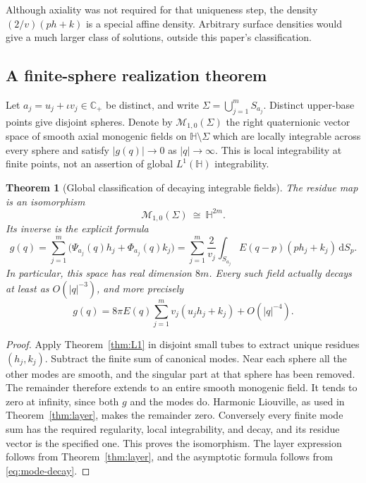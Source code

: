 \documentclass[11pt,a4paper]{article}
\numberwithin{equation}{section}
\newtheorem{theorem}{Theorem}[section]
\theoremstyle{definition}
\theoremstyle{remark}
\newcommand{\C}{\mathbb C}
\newcommand{\HH}{\mathbb H}
\newcommand{\dd}{\,\mathrm d}
\begin{document}
Although axiality was not required for that uniqueness step, the density
$(2/v)(ph+k)$ is a special affine density. Arbitrary surface densities
would give a much larger class of solutions, outside this paper's
classification.

\subsection{A finite-sphere realization theorem}
Let $a_j=u_j+\iota v_j\in\C_+$ be distinct, and write
$\Sigma=\bigcup_{j=1}^m S_{a_j}$. Distinct upper-base points give disjoint
spheres. Denote by $\mathcal M_{1,0}(\Sigma)$ the right quaternionic
vector space of smooth axial monogenic fields on $\HH\setminus\Sigma$
which are locally integrable across every sphere and satisfy
$|g(q)|\to0$ as $|q|\to\infty$. This is local integrability at finite
points, not an assertion of global $L^1(\HH)$ integrability.

\begin{theorem}[Global classification of decaying integrable fields]
\label{thm:global-class}
The residue map is an isomorphism
\begin{equation}\label{eq:global-iso}
 \mathcal M_{1,0}(\Sigma)\ \cong\ \HH^{2m}.
\end{equation}
Its inverse is the explicit formula
\begin{equation}\label{eq:global-field}
 g(q)=\sum_{j=1}^m\bigl(\Psi_{a_j}(q)h_j+\Phi_{a_j}(q)k_j\bigr)
 =\sum_{j=1}^m\frac2{v_j}\int_{S_{a_j}}
              E(q-p)(ph_j+k_j)\dd S_p.
\end{equation}
In particular, this space has real dimension $8m$. Every such field
actually decays at least as $O(|q|^{-3})$, and more precisely
\begin{equation}\label{eq:far-field}
 g(q)=8\pi E(q)\sum_{j=1}^m v_j(u_jh_j+k_j)+O(|q|^{-4}).
\end{equation}
\end{theorem}
\begin{proof}
Apply Theorem~\ref{thm:L1} in disjoint small tubes to extract unique
residues $(h_j,k_j)$. Subtract the finite sum of canonical modes.
Near each sphere all the other modes are smooth, and the singular part
at that sphere has been removed. The remainder therefore extends to
an entire smooth monogenic field. It tends to zero at infinity, since
both $g$ and the modes do. Harmonic Liouville, as used in
Theorem~\ref{thm:layer}, makes the remainder zero. Conversely every
finite mode sum has the required regularity, local integrability, and
decay, and its residue vector is the specified one. This proves the
isomorphism. The layer expression follows from Theorem~\ref{thm:layer},
and the asymptotic formula follows from \eqref{eq:mode-decay}.
\end{proof}
\end{document}
